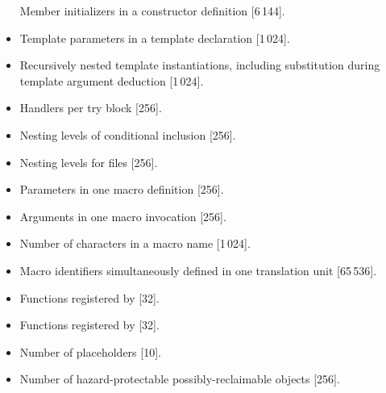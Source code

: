 \begin{itemize}
Member initializers in a constructor definition [6\,144].
\item%
Template parameters in a template declaration [1\,024].
\item%
Recursively nested template instantiations, including substitution
during template argument deduction [1\,024].
\item%
Handlers per try block [256].
\item%
Nesting levels of conditional inclusion [256].
\item%
Nesting levels for
files [256].
\item%
Parameters in one macro definition [256].
\item%
Arguments in one macro invocation [256].
\item%
Number of characters in a macro name [1\,024].
\item%
Macro identifiers simultaneously defined in one
translation unit [65\,536].
\item%
Functions registered by
 [32].
\item%
Functions registered by
 [32].
\item%
Number of placeholders [10].
\item%
Number of hazard-protectable possibly-reclaimable objects [256].

\end{itemize}
